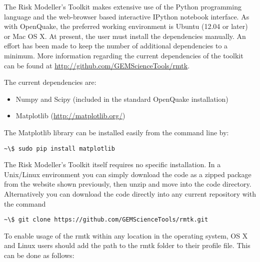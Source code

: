 The Risk Modeller's Toolkit makes extensive use of the Python programming language and the web-browser based interactive IPython notebook interface. As with OpenQuake, the preferred working environment is Ubuntu (12.04 or later) or Mac OS X. At present, the user  must install the dependencies manually. An effort has been made to keep the number of additional dependencies to a minimum. More information regarding the current dependencies of the toolkit can be found at \href{http://github.com/GEMScienceTools/rmtk}{http://github.com/GEMScienceTools/rmtk}.

The current dependencies are:
\begin{itemize}
\item Numpy and Scipy (included in the standard OpenQuake installation)
\item Matplotlib (\href{http://matplotlib.org/}{http://matplotlib.org/})
\end{itemize}

The Matplotlib library can be installed easily from the command line by:

\begin{Verbatim}[frame=single, commandchars=\\\{\}, fontsize=\scriptsize]
~\$ sudo pip install matplotlib
\end{Verbatim}

The Risk Modeller's Toolkit itself requires no specific installation. In a Unix/Linux environment you can simply download the code as a zipped package from the website shown previously, then unzip and move into the code directory. Alternatively you can download the code directly into any current repository with the command

\begin{Verbatim}[frame=single, commandchars=\\\{\}, fontsize=\scriptsize]
~\$ git clone https://github.com/GEMScienceTools/rmtk.git
\end{Verbatim}

To enable usage of the rmtk within any location in the operating system, OS X and Linux users should add the path to the rmtk folder to their profile file. This can be done as follows:


